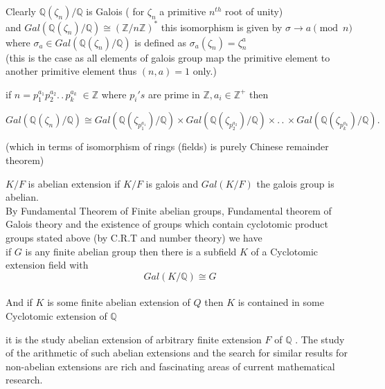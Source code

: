 \documentclass[11pt]{extarticle}
\newcommand{\Z}{\mathbb{Z}}
\newcommand{\Q}{\mathbb{Q}}
\newcommand{\ra}{\rightarrow}
\newcommand{\ck}{.\,.\,}
\newcommand{\snote}[1]{{\footnotesize(#1)}}
\newcommand{\tm}{\times}
\newcommand{\tbx}[2][]{
\begin{tcolorbox}[enhanced,breakable,size=small,colback=black!2!white,title={#1},arc is angular, arc=1.5mm,drop fuzzy shadow]
	#2
\end{tcolorbox}
}
\begin{document}
\begin{multicols}{2}
\tbx[Cyclotomic Extensions theory]{ Clearly $ \Q(\zeta_n)/\Q $ is Galois \snote{ for $ \zeta_n $ a primitive $ n^{th} $ root of unity}\\
   and $ Gal(\Q(\zeta_n)/\Q)\cong (\Z/n\Z)^* $ this isomorphism is given by
   $ \sigma \ra a\pmod{n} $ where $ \sigma_a\in Gal(\Q(\zeta_n)/\Q) $ is defined as $ \sigma_a(\zeta_n)=\zeta_n^a $ \\
   \snote{this is the case as all elements of galois group map the primitive element to another primitive element thus $ (n,a)=1 $ only.}}
  \tbx{  if $ n=p_1^{a_1}p_2^{a_2}\ck p_k^{a_k} \; \in \Z $ where $ p_i's$ are prime in $ \Z, a_i\in 
  	\Z^+ $ then 
  	\begin{center}
  		$  Gal(\Q(\zeta_n)/\Q)\cong Gal( \Q(\zeta_{p_1^{a_1}} )/\Q) \tm Gal( \Q(\zeta_{p_2^{a_2}} )/\Q)  \tm \ck \tm Gal( \Q(\zeta_{p_k^{a_k}} )/\Q) . $
  \end{center} 
\snote{which in terms of isomorphism of rings (fields) is purely Chinese remainder theorem}}
\tbx[Abelian Extension]{ $ K/F $ is abelian extension if $ K/F $ is galois and $ Gal(K/F) $ the galois group is abelian.\\
By Fundamental Theorem of Finite abelian groups, Fundamental theorem of Galois theory and the existence of groups which contain cyclotomic product groups stated  above \snote{by C.R.T and number theory} we have
\\
if $ G $ is any finite abelian group then there is a subfield $ K $ of a Cyclotomic extension field with  
\[Gal(K/\Q)\cong G\]\\
And if $ K $ is some finite abelian extension of $ Q $ then $ K $ is contained in some Cyclotomic extension of $ \Q $ }
\tbx[Class field Theory]{ it is the study abelian extension of arbitrary finite extension $ F $ of $ \Q $ . The study of the arithmetic of such abelian extensions and
	the search for similar results for non-abelian extensions are rich and fascinating areas
	of current mathematical research.}


\end{multicols}
\end{document}
